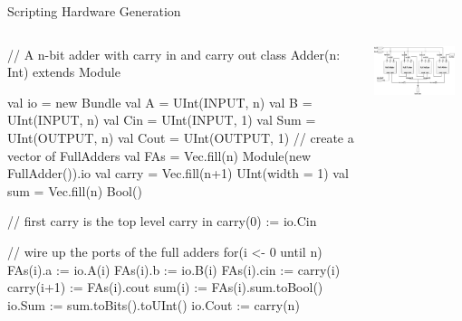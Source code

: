 \documentclass[xcolor=pdflatex,dvipsnames,table]{beamer}
\begin{document}
\begin{frame}[fragile]{Scripting Hardware Generation}

\begin{columns}

{
\begin{scala}
// A n-bit adder with carry in and carry out
class Adder(n: Int) extends Module {
  val io = new Bundle {
    val A    = UInt(INPUT, n)
    val B    = UInt(INPUT, n)
    val Cin  = UInt(INPUT, 1)
    val Sum  = UInt(OUTPUT, n)
    val Cout = UInt(OUTPUT, 1)
  }
  // create a vector of FullAdders
  val FAs   = Vec.fill(n){ Module(new FullAdder()).io }
  val carry = Vec.fill(n+1){ UInt(width = 1) }
  val sum   = Vec.fill(n){ Bool() }

  // first carry is the top level carry in
  carry(0) := io.Cin

  // wire up the ports of the full adders
  for(i <- 0 until n) {
    FAs(i).a   := io.A(i)
    FAs(i).b   := io.B(i)
    FAs(i).cin := carry(i)
    carry(i+1) := FAs(i).cout
    sum(i)     := FAs(i).sum.toBool()
  }
  io.Sum  := sum.toBits().toUInt()
  io.Cout := carry(n)
}
\end{scala}
}


\begin{center}
\includegraphics[width=0.9\textwidth]{../tootorial/4_Bit_Adder.jpg}
\end{center}
\end{columns}

\end{frame}


\end{document}
